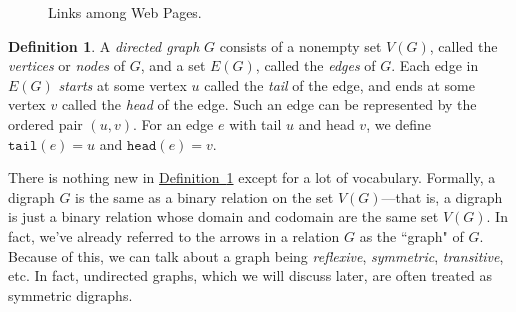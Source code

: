 \documentclass[11pt,oneside]{book}
\theoremstyle{definition}
\newtheorem{defn}[thm]{Definition}
\begin{document}
\begin{figure}[H]
  \centering
  \caption{Links among Web Pages.}
  \label{fig:webPageLinks}
\end{figure}

\begin{defn} \label{defn:digraph}
  A \emph{directed graph} $G$ consists of a nonempty set $V(G)$, called the \emph{vertices} or \emph{nodes} of $G$, and a set $E(G)$, called the \emph{edges} of $G$.
  Each edge in $E(G)$ \emph{starts} at some vertex $u$ called the \emph{tail} of the edge, and ends at some vertex $v$ called the \emph{head} of the edge.
  Such an edge can be represented by the ordered pair $(u, v)$.
  For an edge $e$ with tail $u$ and head $v$, we define $\texttt{tail}(e) = u$ and $\texttt{head}(e) = v$.
\end{defn}

There is nothing new in \hyperref[defn:digraph]{Definition~\ref*{defn:digraph}} except for a lot of vocabulary.
Formally, a digraph $G$ is the same as a binary relation on the set $V(G)$---that is, a digraph is just a binary relation whose domain and codomain are the same set $V(G)$.
In fact, we've already referred to the arrows in a relation $G$ as the ``graph" of $G$.
Because of this, we can talk about a graph being \emph{reflexive}, \emph{symmetric}, \emph{transitive}, etc.
In fact, undirected graphs, which we will discuss later, are often treated as symmetric digraphs.
\end{document}
